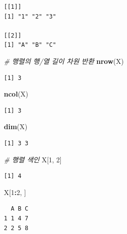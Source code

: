 \documentclass[11pt,a4paper]{book}
\newenvironment{Shaded}{\begin{snugshade}}{\end{snugshade}}
\newcommand{\KeywordTok}[1]{\textcolor[rgb]{0.13,0.29,0.53}{\textbf{#1}}}
\newcommand{\DecValTok}[1]{\textcolor[rgb]{0.00,0.00,0.81}{#1}}
\newcommand{\CommentTok}[1]{\textcolor[rgb]{0.56,0.35,0.01}{\textit{#1}}}
\newcommand{\OperatorTok}[1]{\textcolor[rgb]{0.81,0.36,0.00}{\textbf{#1}}}
\newcommand{\NormalTok}[1]{#1}
\theoremstyle{definition}
\theoremstyle{definition}
\theoremstyle{definition}
\theoremstyle{remark}
\begin{document}
\begin{verbatim}
[[1]]
[1] "1" "2" "3"

[[2]]
[1] "A" "B" "C"
\end{verbatim}

\begin{Shaded}
\begin{Highlighting}[]
\CommentTok{# 행렬의 행/열 길이 차원 반환}
\KeywordTok{nrow}\NormalTok{(X)}
\end{Highlighting}
\end{Shaded}

\begin{verbatim}
[1] 3
\end{verbatim}

\begin{Shaded}
\begin{Highlighting}[]
\KeywordTok{ncol}\NormalTok{(X)}
\end{Highlighting}
\end{Shaded}

\begin{verbatim}
[1] 3
\end{verbatim}

\begin{Shaded}
\begin{Highlighting}[]
\KeywordTok{dim}\NormalTok{(X)}
\end{Highlighting}
\end{Shaded}

\begin{verbatim}
[1] 3 3
\end{verbatim}

\begin{Shaded}
\begin{Highlighting}[]
\CommentTok{# 행렬 색인}
\NormalTok{X[}\DecValTok{1}\NormalTok{, }\DecValTok{2}\NormalTok{]}
\end{Highlighting}
\end{Shaded}

\begin{verbatim}
[1] 4
\end{verbatim}

\begin{Shaded}
\begin{Highlighting}[]
\NormalTok{X[}\DecValTok{1}\OperatorTok{:}\DecValTok{2}\NormalTok{, ]}
\end{Highlighting}
\end{Shaded}

\begin{verbatim}
  A B C
1 1 4 7
2 2 5 8
\end{verbatim}
\end{document}
